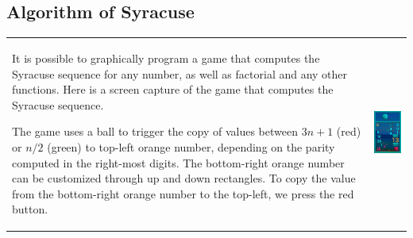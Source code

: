 \documentclass[12pt]{article} %
\begin{document}
\subsection{Algorithm of Syracuse}

\begin{tabular}{l l}
\begin{minipage}{0.5\textwidth}
It is possible to graphically program a game that computes the Syracuse sequence
for any number, as well as factorial and any other functions. Here is a
screen capture of the game that computes the Syracuse sequence.

The game uses a ball to
trigger the copy of values between $3n+1$ (red) or $n/2$ (green) to top-left
orange number, depending on the parity computed in
the right-most digits. The bottom-right orange number can be customized through
up and down rectangles. To copy the value from the bottom-right orange number to
the top-left, we press the red button.
\end{minipage}
&
\begin{minipage}{0.6\textwidth}
\includegraphics[width=2in]{captures/Syracuse}
\end{minipage}
\end{tabular}
\end{document}
